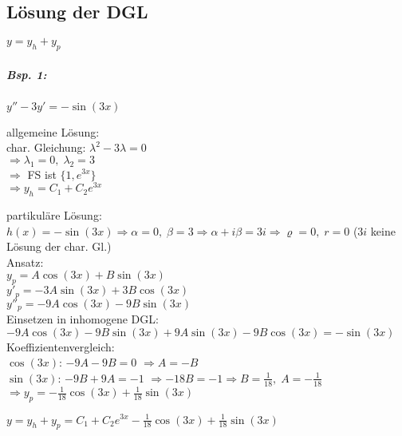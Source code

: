 \subsection*{Lösung der DGL}
$\boxed{y=y_h+y_p}$

\subparagraph{Bsp. 1:} $y''-3y'=-\sin (3x)$
\begin{anumerate}
\item allgemeine Lösung:\\
char. Gleichung: $\lambda^2-3\lambda = 0$\\
$\Rightarrow \lambda_1=0, \; \lambda_2=3$\\
$\Rightarrow$ FS ist $\{1,e^{3x}\}$\\
$\Rightarrow y_h=C_1+C_2 e^{3x}$
\item partikuläre Lösung:\\
$h(x)=-\sin (3x) \Rightarrow \alpha = 0,\; \beta =3 \Rightarrow \alpha + i\beta = 3i \Rightarrow \varrho = 0, \; r=0$ ($3i$ keine Lösung der char. Gl.)\\
Ansatz:\\
$y_p=A\cos (3x) + B\sin (3x)$\\
$y'_p=-3A\sin (3x) + 3B \cos (3x)$\\
$y''_p=-9A\cos (3x) - 9B \sin (3x)$\\
Einsetzen in inhomogene DGL:\\
$-9A\cos (3x) - 9 B\sin (3x) + 9A\sin(3x) - 9 B \cos (3x) = -\sin (3x)$\\
Koeffizientenvergleich:\\
$\cos (3x)$: $-9A-9B=0$ $\Rightarrow A = -B$\\
$\sin (3x)$: $-9B+9A=-1$ $\Rightarrow -18B=-1 \Rightarrow B = \frac{1}{18}, \; A=-\frac{1}{18}$\\
$\Rightarrow y_p = -\frac{1}{18}\cos(3x) + \frac{1}{18} \sin (3x)$
\item $y=y_h+y_p=C_1+C_2e^{3x}-\frac{1}{18} \cos (3x) + \frac{1}{18}\sin (3x)$
\end{anumerate}

